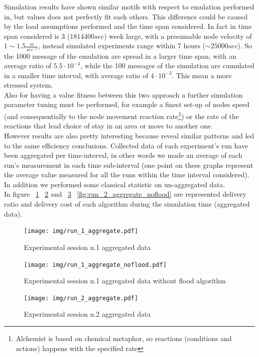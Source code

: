 Simulation results have shown similar motifs with respect to emulation performed in\cite{bubble}, but values does not perfectly fit each others. This difference could be caused by the load assumptions performed and the time span considered. In fact in\cite{bubble} time span considered is 3 ($1814400 sec$) week large, with a presumable node velocity of $1\sim1.5 \frac{m}{sec^{-1}}$, instead simulated experiments range within 7 hours ($\sim 25000 sec$). So the 1000 message of the emulation are spread in a larger time span, with an average ratio of $5.5\cdot 10^{-4}$, while the 100 messages of the simulation are cumulated in a smaller time interval, with average ratio of $4\cdot 10^{-3}$. This mean a more stressed system.\\
Also for having a value fitness between this two approach a further simulation parameter tuning must be performed, for example a finest set-up of nodes speed (and consequentially to the node movement reaction rate\footnote{Alchemist is based on chemical metaphor, so reactions (conditions and actions) happens with the specified rate}) or the rate of the reactions that lead choice of stay in an area or move to another one.\\
However results are also pretty interesting because reveal similar patterns and led to the same efficiency conclusions. Collected data of each experiment's run have been aggregated per time-interval, in other words we made an average of each run's measurement in each time sub-interval (one point on these graphs represent the average value measured for all the runs within the time interval considered). In addition we performed some classical statistic on un-aggregated data.\\
In figure ~\ref{fig:run_1_aggregate} ~\ref{fig:run_1_aggregate_noflood} and ~\ref{fig:run_2_aggregate} ~\ref{fig:run_2_aggregate_noflood} are represented delivery ratio and delivery cost of each algorithm during the simulation time (aggregated data).\\
\newpage
\begin{center}
\begin{figure}[h!]
        \centering
    		\label{fig:run_1_aggregate}
    		\texttt{[image: img/run\_1\_aggregate.pdf]}
    		\caption{Experimental session n.1 aggregated data}
\end{figure}
\begin{figure}[h!]
		\centering
    		\label{fig:run_1_aggregate_noflood}
    		\texttt{[image: img/run\_1\_aggregate\_noflood.pdf]}
    		\caption{Experimental session n.1 aggregated data without flood algorithm}
\end{figure}
\end{center}
\newpage
\begin{figure}[h!]
	\begin{center}
    \label{fig:run_2_aggregate}
    \texttt{[image: img/run\_2\_aggregate.pdf]}
    \caption{Experimental session n.2 aggregated data}
  \end{center}
\end{figure}

